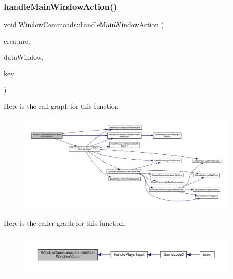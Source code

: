 \subsubsection{\texorpdfstring{handle\+Main\+Window\+Action()}{handleMainWindowAction()}}
{\footnotesize\ttfamily void Window\+Commands\+::handle\+Main\+Window\+Action (\begin{DoxyParamCaption}\item[{\mbox{\hyperlink{class_base_creature}{Base\+Creature}} \&}]{creature,  }\item[{\mbox{\hyperlink{class_data_window}{Data\+Window}} \&}]{data\+Window,  }\item[{sf\+::\+Keyboard\+::\+Key}]{key }\end{DoxyParamCaption})}

Here is the call graph for this function\+:
\nopagebreak
\begin{figure}[H]
\begin{center}
\leavevmode
\includegraphics[width=350pt]{class_window_commands_ac4a64479853dfa15653a7690403815b7_cgraph}
\end{center}
\end{figure}
Here is the caller graph for this function\+:
\nopagebreak
\begin{figure}[H]
\begin{center}
\leavevmode
\includegraphics[width=350pt]{class_window_commands_ac4a64479853dfa15653a7690403815b7_icgraph}
\end{center}
\end{figure}
\mbox{\label{class_window_commands_a9b124a88e3af586738fe6b3cbce6fda2}} 
